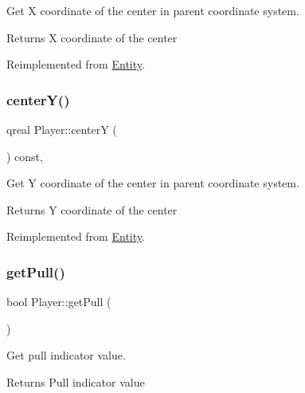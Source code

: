 Get X coordinate of the center in parent coordinate system. 

\begin{DoxyReturn}{Returns}
X coordinate of the center 
\end{DoxyReturn}


Reimplemented from \hyperlink{class_entity_aa404777579f858d2e4dd0c584c20c95a}{Entity}.

\mbox{\label{class_player_ac67429e56fbd74495b4614b7b27ca5f6}} 
\subsubsection{\texorpdfstring{center\+Y()}{centerY()}}
{\footnotesize\ttfamily qreal Player\+::centerY (\begin{DoxyParamCaption}{ }\end{DoxyParamCaption}) const\hspace{0.3cm}{\ttfamily [override]}, {\ttfamily [virtual]}}



Get Y coordinate of the center in parent coordinate system. 

\begin{DoxyReturn}{Returns}
Y coordinate of the center 
\end{DoxyReturn}


Reimplemented from \hyperlink{class_entity_ac0af460a15e0d087d8fbbbe1e6f7dd95}{Entity}.

\mbox{\label{class_player_a0a2bc2291e910c06bde3c6c9d4173cd1}} 
\subsubsection{\texorpdfstring{get\+Pull()}{getPull()}}
{\footnotesize\ttfamily bool Player\+::get\+Pull (\begin{DoxyParamCaption}{ }\end{DoxyParamCaption})}



Get pull indicator value. 

\begin{DoxyReturn}{Returns}
Pull indicator value 
\end{DoxyReturn}
\mbox{\label{class_player_a8bd85eaca498fc1c6638dbe90e694db8}} 
